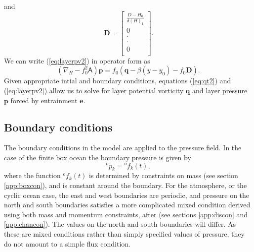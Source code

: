 \documentclass[11pt, a4paper,twoside]{article}
\newcommand{\p}[2]{{{}^{#1}p_{#2}}}
\newcommand{\f}[2]{{{}^{#1}f_{#2}}}
\newcommand{\vc}[1]{\mathbf{#1}}
\newcommand{\mtx}[1]{\vc{\mathsf{#1}}}
\newcommand{\Dt}[1]{\vc{{}^{#1}\vc{D}}}
\numberwithin{equation}{section}
\begin{document}
and
\begin{equation}\label{eq:matda}
\Dt{} =
\left[ \begin{array}{c}
\frac{D - H_0}{\delta(H)_1}\\
0\\
\cdot\\
\cdot\\
0\\
 \end{array}\right].
\end{equation}
We can write (\ref{eq:layerpv2}) in operator form as
\begin{equation}\label{eq:layerpv3}
\left(\nabla_H - f^2_0\mtx{A} \right)\vc{p}  = f_0\left(\vc{q} - \beta(y - y_0) - f_0\vc{D}\right).
\end{equation}
Given appropriate intial and boundary conditions, equations (\ref{eq:qt2}) and (\ref{eq:layerpv2}) allow us to solve for layer potential vorticity $\vc{q}$ and layer pressure $\vc{p}$ forced by entrainment $\vc{e}$.

\subsection{Boundary conditions}
The boundary conditions in the model are applied to the pressure field.
In the case of the finite box ocean the boundary pressure is given by
\begin{equation}\label{eq:bc1}
\p{o}{k} = \f{o}{k}(t),
\end{equation}
where the function $\f{o}{k}(t)$ is determined by constraints on mass
(see section \ref{app:boxcon}), and is constant around the boundary. 
For the atmosphere, or the cyclic ocean case, the east and west
boundaries are periodic, and pressure on the north and south boundaries
satisfies a more complicated mixed condition derived using
both mass and momentum constraints, after \citet{mcwilliams:77}
(see sections \ref{app:discon} and \ref{app:chancon}). 
The values on the north and south boundaries will differ. 
As these are mixed conditions rather than simply specified values of pressure, they do not amount to a simple flux condition.
\end{document}
